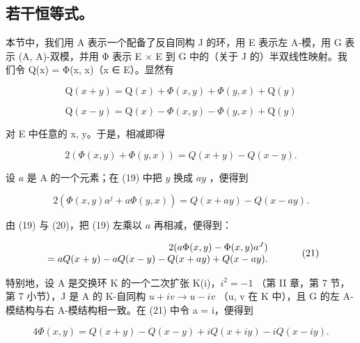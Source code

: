 \subsection{若干恒等式。}

本节中，我们用 A 表示一个配备了反自同构 J 的环，用 E 表示左 A-模，用 G 表示 (A, A)-双模，并用 Φ 表示 E × E 到 G 中的（关于 J 的）半双线性映射。我们令 Q(x) = Φ(x, x)（x ∈ E）。显然有

\[
\mathrm{Q} (x + y) = \mathrm{Q} (x) + \Phi (x, y) + \Phi (y, x) + \mathrm{Q} (y)\tag{17}
\]

\[
\mathrm{Q} (x - y) = \mathrm{Q} (x) - \Phi (x, y) - \Phi (y, x) + \mathrm{Q} (y)\tag{18}
\]

对 E 中任意的 x, y。于是，相减即得

\[
2 (\Phi (x, y) + \Phi (y, x)) = Q (x + y) - Q (x - y).\tag{19}
\]

设 \(a\) 是 A 的一个元素；在 (19) 中把 \(y\) 换成 \(ay\) ，便得到

\[
2 (\Phi (x, y) a ^ {j} + a \Phi (y, x)) = Q (x + a y) - Q (x - a y).\tag{20}
\]

由 (19) 与 (20)，把 (19) 左乘以 \(a\) 再相减，便得到：

\[
\begin{array}{r l} 2 (a \Phi (x, y) - \Phi (x, y) a ^ {J}) & \\ = a Q (x + y) - a Q (x - y) - Q (x + a y) + Q (x - a y). \end{array}\tag{21}
\]

特别地，设 A 是交换环 K 的一个二次扩张 K(i)，\(i^{2} = -1\) （第 II 章，第 7 节，第 7 小节），J 是 A 的 K-自同构 \(u + iv \rightarrow u - iv\) （u, v 在 K 中），且 G 的左 A-模结构与右 A-模结构相一致。在 (21) 中令 a = i，便得到

\[
4 \Phi (x, y) = Q (x + y) - Q (x - y) + i Q (x + i y) - i Q (x - i y). \tag {22}
\]

